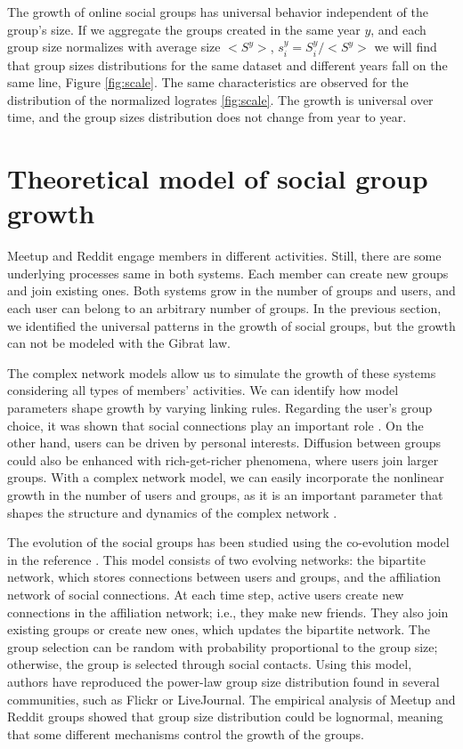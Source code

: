 The growth of online social groups has universal behavior independent of the group's size. If we aggregate the groups created in the same year $y$, and each group size normalizes with average size $<S^y>$, $s^{y}_{i}=S^{y}_{i}/<S^{y}>$ we will find that group sizes distributions for the same dataset and different years fall on the same line, Figure \ref{fig:scale}. The same characteristics are observed for the distribution of the normalized logrates \ref{fig:scale}. The growth is universal over time, and the group sizes distribution does not change from year to year.

\clearpage
\newpage
\section{Theoretical model of social group growth} %

Meetup and Reddit engage members in different activities. Still, there are some underlying processes same in both systems. Each member can create new groups and join existing ones. Both systems grow in the number of groups and users, and each user can belong to an arbitrary number of groups. In the previous section, we identified the universal patterns in the growth of social groups, but the growth can not be modeled with the Gibrat law. 

The complex network models allow us to simulate the growth of these systems considering all types of members' activities. We can identify how model parameters shape growth by varying linking rules.
Regarding the user's group choice, it was shown that social connections play an important role \cite{kairam2012life, zheleva2009co}. On the other hand, users can be driven by personal interests. Diffusion between groups could also be enhanced with rich-get-richer phenomena, where users join larger groups. With a complex network model, we can easily incorporate the nonlinear growth in the number of users and groups, as it is an important parameter that shapes the structure and dynamics of the complex network \cite{mitrovic2011quantitative, dankulov2015dynamics, vranic2021growth}.

The evolution of the social groups has been studied using the co-evolution model in the reference  \cite{zheleva2009co}. This model consists of two evolving networks: the bipartite network, which stores connections between users and groups, and the affiliation network of social connections. At each time step, active users create new connections in the affiliation network; i.e., they make new friends. They also join existing groups or create new ones, which updates the bipartite network. The group selection can be random with probability proportional to the group size; otherwise, the group is selected through social contacts. Using this model, authors have reproduced the power-law group size distribution found in several communities, such as Flickr or LiveJournal. The empirical analysis of Meetup and Reddit groups showed that group size distribution could be lognormal, meaning that some different mechanisms control the growth of the groups.

